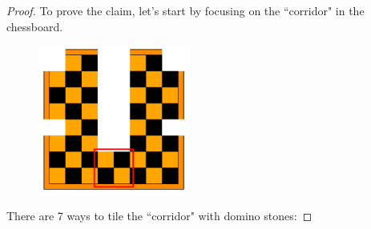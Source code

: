 \documentclass[12pt,a4]{article}
\theoremstyle{exercise}
\begin{document}
\begin{proof}
	To prove the claim, let's start by focusing on the ``corridor" in the chessboard.
    \begin{figure}[h]
        \small
        \centering
        \includegraphics[width=5cm]{corridor.png}
        \label{fig:corridor}
    \end{figure}

    There are 7 ways to tile the ``corridor" with domino stones:


\end{proof}
\end{document}
